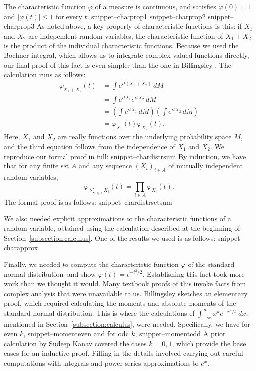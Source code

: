 \documentclass{svjour3}
\newcommand{\ph}{\varphi}
\newcommand{\Snippet}[1]{\csname snippet--#1\endcsname}
\begin{document}
The characteristic function $\ph$ of a measure is continuous, and satisfies $\ph(0) = 1$ and $|\ph(t)| \leq 1$ for every $t$:
\Snippet{charprop1}
\Snippet{charprop2}
\Snippet{charprop3}
As noted above, a key property of characteristic functions is this: if $X_1$ and $X_2$ are independent random variables, the characteristic function of $X_1 + X_2$ is the product of the individual characteristic functions. Because we used the Bochner integral, which allows us to integrate complex-valued functions directly, our final proof of this fact is even simpler than the one in Billingsley \cite{billingsley:95}. The calculation runs as follows:
\begin{align*}
\ph_{X_1 + X_2}(t) &= \int e^{i t (X_1 + X_2)} \, dM  \\
                   &= \int e^{i t X_1} e^{i t X_2} \, dM \\
                   &= \left(\int e^{i t X_1} \, dM\right) \left(\int e^{i t X_2} \, dM\right) \\
                   &= \ph_{X_1}(t) \ph_{X_2}(t).
\end{align*}
Here, $X_1$ and $X_2$ are really functions over the underlying probability space $M$, and the third equation follows from the independence of $X_1$ and $X_2$. We reproduce our formal proof in full:
\Snippet{chardistrsum}
By induction, we have that for any finite set $A$ and any sequence $(X_i)_{i \in A}$ of mutually independent random variables,
\[
\ph_{\sum_{i \in A} X_i}(t) = \prod_{i \in A} \ph_{X_i}(t).
\]
The formal proof is as follows:
\Snippet{chardistrsetsum}

We also needed explicit approximations to the characteristic functions of a random variable, obtained using the calculation described at the beginning of Section~\ref{subsection:calculus}. One of the results we used is as follows:
\Snippet{charapprox}

Finally, we needed to compute the characteristic function $\ph$ of the standard normal distribution, and show $\ph(t) = e^{-t^2/2}$. Establishing this fact took more work than we thought it would. Many textbook proofs of this invoke facts from complex analysis that were unavailable to us. Billingsley \cite[page 344]{billingsley:95} sketches an elementary proof, which required calculating the moments and absolute moments of the standard normal distribution. This is where the calculations of $\int_{-\infty}^\infty x^k e^{-x^2 / t} \; dx$, mentioned in Section~\ref{subsection:calculus}, were needed. Specifically, we have for even $k$,
\Snippet{momenteven}
and for odd $k$,
\Snippet{momentodd}
A prior calculation by Sudeep Kanav covered the cases $k = 0, 1$, which provide the base cases for an inductive proof. Filling in the details involved carrying out careful computations with integrals and power series approximations to $e^x$.
\end{document}

